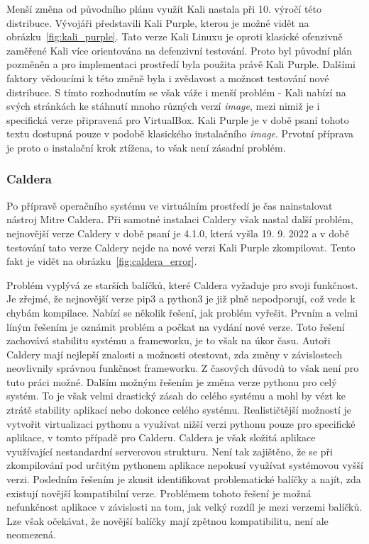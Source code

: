 
Menší změna od původního plánu využít Kali nastala při 10. výročí této distribuce\cite{kali_purple}.
Vývojáři představili Kali Purple, kterou je možné vidět na obrázku~\ref{fig:kali_purple}.
Tato verze Kali Linuxu je oproti klasické ofenzivně zaměřené Kali více orientována na defenzivní testování.
Proto byl původní plán pozměněn a pro implementaci prostředí byla použita právě Kali Purple.
Dalšími faktory vědoucími k této změně byla i zvědavost a možnost testování nové distribuce.
S tímto rozhodnutím se však váže i menší problém - Kali nabízí na svých stránkách ke stáhnutí mnoho různých verzí \textit{image}, mezi nimiž je i specifická verze připravená pro VirtualBox.
Kali Purple je v době psaní tohoto textu dostupná pouze v podobě klasického instalačního \textit{image}.
Prvotní příprava je proto o instalační krok ztížena, to však není zásadní problém.

\subsubsection{Caldera}
Po přípravě operačního systému ve virtuálním prostředí je čas nainstalovat nástroj Mitre Caldera.
Při samotné instalaci Caldery však nastal další problém, nejnovější verze Caldery v době psaní je 4.1.0, která vyšla 19. 9. 2022 a v době testování tato verze Caldery nejde na nové verzi Kali Purple zkompilovat.
Tento fakt je vidět na obrázku~\ref{fig:caldera_error}.


\noindent %
Problém vyplývá ze starších balíčků, které Caldera vyžaduje pro svoji funkčnost.
Je zřejmé, že nejnovější verze pip3 a python3 je již plně nepodporují, což vede k chybám kompilace.
Nabízí se několik řešení, jak problém vyřešit.
Prvním a velmi líným řešením je oznámit problém a počkat na vydání nové verze.
Toto řešení zachovává stabilitu systému a frameworku, je to však na úkor času.
Autoři Caldery mají nejlepší znalosti a možnosti otestovat, zda změny v závislostech neovlivnily správnou funkčnost frameworku.
Z časových důvodů to však není pro tuto práci možné.
Dalším možným řešením je změna verze pythonu pro celý systém.
To je však velmi drastický zásah do celého systému a mohl by vézt ke ztrátě stability aplikací nebo dokonce celého systému.
Realističtější možností je vytvořit virtualizaci pythonu a využívat nižší verzi pythonu pouze pro specifické aplikace, v tomto případě pro Calderu.
Caldera je však složitá aplikace využívající nestandardní serverovou strukturu.
Není tak zajištěno, že se při zkompilování pod určitým pythonem aplikace nepokusí využívat systémovou vyšší verzi.
Posledním řešením je zkusit identifikovat problematické balíčky a najít, zda existují novější kompatibilní verze.
Problémem tohoto řešení je možná nefunkčnost aplikace v závislosti na tom, jak velký rozdíl je mezi verzemi balíčků.
Lze však očekávat, že novější balíčky mají zpětnou kompatibilitu, není ale neomezená.

